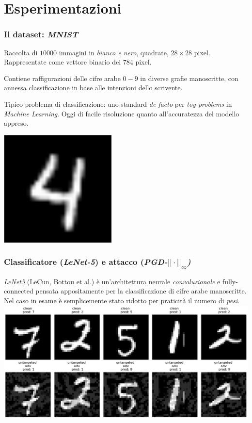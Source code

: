 \documentclass{beamer}
\begin{document}
\section{Esperimentazioni}{

\begin{frame}
	\frametitle{Il dataset: \textit{MNIST}}
	Raccolta di $10000$ immagini in \textit{bianco e nero}, quadrate, $28 \times 28$ pixel. Rappresentate come vettore binario dei $784$ pixel.
	\hfill\break

	Contiene raffigurazioni delle cifre arabe $0-9$ in diverse grafie manoscritte, con annessa classificazione in base alle intenzioni dello scrivente.
	\hfill\break

	Tipico problema di classificazione: uno standard \textit{de facto} per \textit{toy-problems} in \textit{Machine Learning}. Oggi di facile risoluzione quanto all'accuratezza del modello appreso.
	\hfill\break

	\center \includegraphics[height=0.18\linewidth]{mnist-sample-four.png}
\end{frame}


\begin{frame}
	\frametitle{Classificatore (\textit{LeNet-5}) e attacco (\textit{PGD-${||\cdot||}_{\infty}$)}}
	\textit{LeNet5} (LeCun, Bottou et al.) è un'architettura neurale \textit{convoluzionale} e {fully-connected} pensata appositamente per la classificazione di cifre arabe manoscritte. Nel caso in esame è semplicemente stato ridotto per praticità il numero di \textit{pesi}.
	\hfill\break
	\center \includegraphics[height=0.40\linewidth]{mnist-adv-pgdlinf.png}
\end{frame}

}
\end{document}
